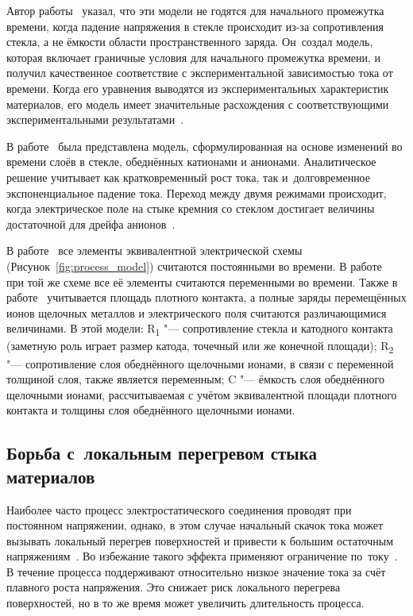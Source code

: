 Автор работы~\cite{Albaugh1991electrode_phenomena}
указал, что эти модели не годятся для начального промежутка времени, когда падение напряжения в стекле происходит из-за сопротивления стекла, а не ёмкости области пространственного заряда. Он~создал модель, которая включает граничные условия для начального промежутка времени, и получил качественное соответствие с экспериментальной зависимостью тока от времени. Когда его уравнения выводятся из экспериментальных характеристик материалов, его модель имеет значительные расхождения с соответствующими экспериментальными результатами~\cite{Rios2000_modelling_current}.

В работе~\cite{Rios2000_modelling_current} была представлена модель, сформулированная на основе изменений во времени слоёв в стекле, обеднённых катионами и анионами.
Аналитическое решение учитывает как кратковременный рост тока, так и~долговременное экспоненциальное падение тока. Переход между двумя режимами происходит, когда электрическое поле на стыке кремния со стеклом достигает величины достаточной для дрейфа анионов~\cite{Rios2000_modelling_current}.

В работе~\cite{Anthony_AB_of_imperfect_surfaces} все элементы эквивалентной электрической схемы (Рисунок~\ref{fig:process_model}) считаются постоянными во времени. В работе~\cite{He2015_electric_curr_charact} при той же схеме все её элементы считаются переменными во времени. Также в работе~\cite{He2015_electric_curr_charact} учитывается площадь плотного контакта, а полные заряды перемещённых ионов щелочных металлов и электрического поля считаются различающимися величинами. В этой модели: R\textsubscript{1} "--- сопротивление стекла и катодного контакта (заметную роль играет размер катода, точечный или же конечной площади); R\textsubscript{2} "--- сопротивление слоя обеднённого щелочными ионами, в связи с переменной толщиной слоя, также является переменным; C "--- ёмкость слоя обеднённого щелочными ионами, рассчитываемая с учётом эквивалентной площади плотного контакта и толщины слоя обеднённого щелочными ионами.

\subsection{Борьба с~локальным перегревом стыка материалов}\label{chap:local_heating}

Наиболее часто процесс электростатического соединения проводят при постоянном напряжении, однако, в этом случае начальный скачок тока может вызывать локальный перегрев поверхностей и привести к большим остаточным напряжениям~\cite{Sinev_osoben_primen_inzh_vest201408}.
Во избежание такого эффекта применяют ограничение по~току~\cite{Rogers_current_limited_AB_2005}.
В течение процесса поддерживают относительно низкое значение тока за счёт плавного роста напряжения.
Это снижает риск локального перегрева поверхностей, но в то же время может увеличить длительность процесса.

